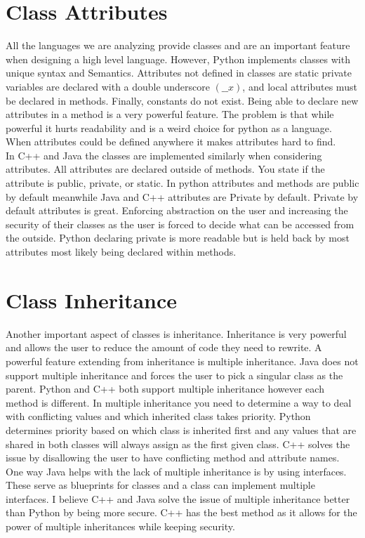 \documentclass[sigconf, nonacm, authorversion, language=english, 12pt]{acmart}
\def\tab{\hspace*{5mm}}
\begin{document}
\section{Class Attributes}

\tab All the languages we are analyzing provide classes and are an important feature when designing a high level language. However, Python implements classes with unique
syntax and Semantics. Attributes not defined in classes are static private variables are declared with a double underscore $(\_\_x)$, and local
attributes must be declared in methods. Finally, constants do not exist. Being able to declare new attributes in a method is a very powerful feature.
The problem is that while powerful it hurts readability and is a weird choice for python as a language. When attributes could be defined anywhere it makes attributes hard to find.\\

\tab In C++ and Java the classes are implemented similarly when considering attributes. All attributes are declared outside of methods. You state if the attribute is public, private, or static.
In python attributes and methods are public by default meanwhile Java and C++ attributes are Private by default. Private by default attributes is great. Enforcing abstraction on the user and
increasing the security of their classes as the user is forced to decide what can be accessed from the outside. Python declaring private is more readable but is held back by most attributes
most likely being declared within methods.\\

\section{Class Inheritance}

\tab Another important aspect of classes is inheritance. Inheritance is very powerful and allows the user to reduce the amount of code they need to rewrite. A powerful feature extending from
inheritance is multiple inheritance. Java does not support multiple inheritance and forces the user to pick a singular class as the parent. Python and C++ both support multiple inheritance
however each method is different. In multiple inheritance you need to determine a way to deal with conflicting values and which inherited class takes priority. Python determines priority based
on which class is inherited first and any values that are shared in both classes will always assign as the first given class. C++ solves the issue by disallowing the user to have conflicting
method and attribute names. One way Java helps with the lack of multiple inheritance is by using interfaces. These serve as blueprints for classes and a class can implement multiple interfaces.
I believe C++ and Java solve the issue of multiple inheritance better than Python by being more secure. C++ has the best method as it allows for the power of
multiple inheritances while keeping security.\\
\end{document}
